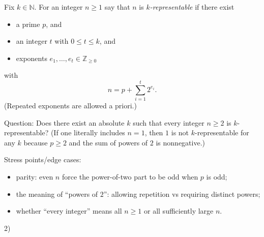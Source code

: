 Fix $k\in\mathbb{N}$. For an integer $n\ge 1$ say that $n$ is \emph{$k$-representable} if there exist
\begin{itemize}
\item a prime $p$, and
\item an integer $t$ with $0\le t\le k$, and
\item exponents $e_1,\dots,e_t\in\mathbb{Z}_{\ge 0}$
\end{itemize}
with
\[
 n = p + \sum_{i=1}^t 2^{e_i}.
\]
(Repeated exponents are allowed a priori.)

Question: Does there exist an absolute $k$ such that every integer $n\ge 2$ is $k$-representable?
(If one literally includes $n=1$, then $1$ is not $k$-representable for any $k$ because $p\ge 2$ and the sum of powers of $2$ is nonnegative.)

Stress points/edge cases:
\begin{itemize}
\item parity: even $n$ force the power-of-two part to be odd when $p$ is odd;
\item the meaning of ``powers of $2$'': allowing repetition vs requiring distinct powers;
\item whether ``every integer'' means all $n\ge 1$ or all sufficiently large $n$.
\end{itemize}

2)
